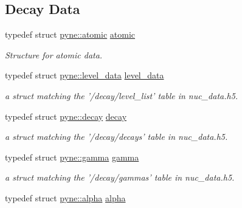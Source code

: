 \subsection*{Decay Data}
\begin{DoxyCompactItemize}
\item 
\hypertarget{namespacepyne_abaa14a5fe8b9e50c101b962f74241928}{typedef struct \hyperlink{structpyne_1_1atomic}{pyne\-::atomic} \hyperlink{namespacepyne_abaa14a5fe8b9e50c101b962f74241928}{atomic}}\label{namespacepyne_abaa14a5fe8b9e50c101b962f74241928}

\begin{DoxyCompactList}\small\item\em Structure for atomic data. \end{DoxyCompactList}\item 
\hypertarget{namespacepyne_a0b3fcf211f0b5f4673867caf0d1750a8}{typedef struct \hyperlink{structpyne_1_1level__data}{pyne\-::level\-\_\-data} \hyperlink{namespacepyne_a0b3fcf211f0b5f4673867caf0d1750a8}{level\-\_\-data}}\label{namespacepyne_a0b3fcf211f0b5f4673867caf0d1750a8}

\begin{DoxyCompactList}\small\item\em a struct matching the '/decay/level\-\_\-list' table in nuc\-\_\-data.\-h5. \end{DoxyCompactList}\item 
\hypertarget{namespacepyne_ad71ccbdf6a5a6d0a42d06226cffca8ff}{typedef struct \hyperlink{structpyne_1_1decay}{pyne\-::decay} \hyperlink{namespacepyne_ad71ccbdf6a5a6d0a42d06226cffca8ff}{decay}}\label{namespacepyne_ad71ccbdf6a5a6d0a42d06226cffca8ff}

\begin{DoxyCompactList}\small\item\em a struct matching the '/decay/decays' table in nuc\-\_\-data.\-h5. \end{DoxyCompactList}\item 
\hypertarget{namespacepyne_a3deec572922f7eedfa646410158a1345}{typedef struct \hyperlink{structpyne_1_1gamma}{pyne\-::gamma} \hyperlink{namespacepyne_a3deec572922f7eedfa646410158a1345}{gamma}}\label{namespacepyne_a3deec572922f7eedfa646410158a1345}

\begin{DoxyCompactList}\small\item\em a struct matching the '/decay/gammas' table in nuc\-\_\-data.\-h5. \end{DoxyCompactList}\item 
\hypertarget{namespacepyne_a3fc79ae6aadb879f43b288c4241ab398}{typedef struct \hyperlink{structpyne_1_1alpha}{pyne\-::alpha} \hyperlink{namespacepyne_a3fc79ae6aadb879f43b288c4241ab398}{alpha}}\label{namespacepyne_a3fc79ae6aadb879f43b288c4241ab398}


\end{DoxyCompactItemize}
